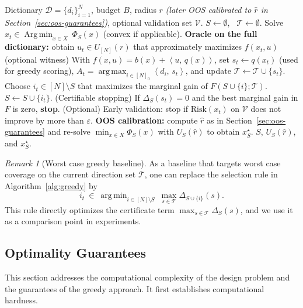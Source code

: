 \documentclass[accepted]{uai2026}
\theoremstyle{plain}
\theoremstyle{definition}
\theoremstyle{remark}
\newtheorem{remark}[theorem]{Remark}
\newcommand{\ip}[2]{\left\langle #1 ,\, #2 \right\rangle}
\DeclareMathOperator*{\Argmin}{Arg\,min}
\DeclareMathOperator*{\argmin}{arg\,min}
\DeclareMathOperator*{\argmax}{arg\,max}
\begin{document}
\begin{algorithm}[h]
\caption{Oracle assisted greedy for designing $U_S(r)$}
\label{alg:greedy}
\begin{algorithmic}[1]
    Dictionary $\mathcal{D}=\{d_i\}_{i=1}^N$, budget $B$, radius $r$ \emph{(later OOS calibrated to $\widehat r$ in Section~\ref{sec:oos-guarantees})}, optional validation set $\mathcal{V}$.
   \STATE $S\gets \emptyset$, \ $\mathcal{T}\gets \emptyset$.
      \STATE Solve $x_t \in \Argmin_{x\in X}\ \Phi_S(x)$ \hfill (convex if applicable).
      \STATE \textbf{Oracle on the full dictionary:} obtain $u_t\in U_{[N]}(r)$ that approximately maximizes $f(x_t,u)$ \hfill (optional witness)
      \STATE With $f(x,u)=b(x)+\ip{u}{q(x)}$, set $s_t\leftarrow q(x_t)$ (used for greedy scoring), $A_t=\argmax_{i\in [N]_0}\ip{d_i}{s_t}$, and update $\mathcal{T}\gets \mathcal{T}\cup\{s_t\}$.
      \STATE Choose $i_t\in[N]\setminus S$ that maximizes the marginal gain of $F(S\cup\{i\};\mathcal{T})$.
      \STATE $S\gets S\cup\{i_t\}$.
      \STATE (Certifiable stopping) If $\Delta_S(s_t)=0$ and the best marginal gain in $F$ is zero, \textbf{stop}.
      \STATE (Optional) Early validation: stop if $\mathrm{Risk}(x_t)$ on $\mathcal{V}$ does not improve by more than $\varepsilon$.
   \ENDFOR
   \STATE \textbf{OOS calibration:} compute $\widehat r$ as in Section~\ref{sec:oos-guarantees} and re-solve $\min_{x\in X}\Phi_S(x)$ with $U_S(\widehat r)$ to obtain $x_S^\star$.
    $S$, $U_S(\widehat r)$, and $x_S^\star$.
\end{algorithmic}
\end{algorithm}


\begin{remark}[Worst case greedy baseline]\label{rmk:greedy-maxgap}
As a baseline that targets worst case coverage on the current direction set $\mathcal T$, one can replace the selection rule in Algorithm~\ref{alg:greedy} by
\[
i_t\ \in\ \argmin_{i\in[N]\setminus S}\ \max_{s\in\mathcal T}\Delta_{S\cup\{i\}}(s).
\]
This rule directly optimizes the certificate term $\max_{s\in\mathcal T}\Delta_S(s)$, and we use it as a comparison point in experiments.
\end{remark}

\subsection{Optimality Guarantees}

This section addresses the computational complexity of the design problem and the guarantees of the greedy approach. It first establishes computational hardness.
\end{document}
